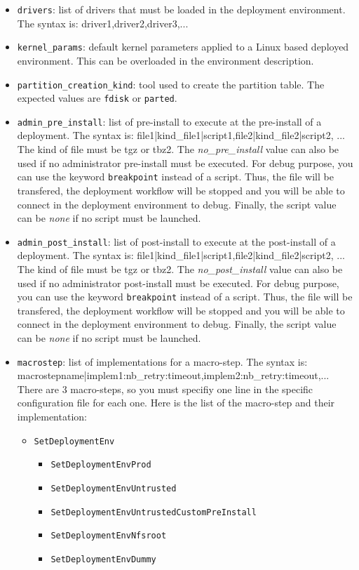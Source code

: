 \documentclass[a4wide,10pt,oneside]{book}
\begin{document}
\begin{itemize}
\item \texttt{drivers}: list of drivers that must be loaded in the deployment environment. The syntax is: driver1,driver2,driver3,...
\item \texttt{kernel\_params}: default kernel parameters applied to a Linux based deployed environment. This can be overloaded in the environment description.
\item \texttt{partition\_creation\_kind}: tool used to create the partition table. The expected values are \texttt{fdisk} or \texttt{parted}.
\item \texttt{admin\_pre\_install}: list of pre-install to execute at the pre-install of a deployment. The syntax is: file1|kind\_file1|script1,file2|kind\_file2|script2, ... The kind of file must be tgz or tbz2. The \textit{no\_pre\_install} value can also be used if no administrator pre-install must be executed. For debug purpose, you can use the keyword \texttt{breakpoint} instead of a script. Thus, the file will be transfered, the deployment workflow will be stopped and you will be able to connect in the deployment environment to debug. Finally, the script value can be \textit{none} if no script must be launched.
\item \texttt{admin\_post\_install}: list of post-install to execute at the post-install of a deployment. The syntax is: file1|kind\_file1|script1,file2|kind\_file2|script2, ... The kind of file must be tgz or tbz2. The \textit{no\_post\_install} value can also be used if no administrator post-install must be executed. For debug purpose, you can use the keyword \texttt{breakpoint} instead of a script. Thus, the file will be transfered, the deployment workflow will be stopped and you will be able to connect in the deployment environment to debug. Finally, the script value can be \textit{none} if no script must be launched.
\item \texttt{macrostep}: list of implementations for a macro-step. The syntax is: macrostepname|implem1:nb\_retry:timeout,implem2:nb\_retry:timeout,... There are 3 macro-steps, so you must specifiy one line in the specific configuration file for each one. Here is the list of the macro-step and their implementation:
  \begin{itemize}
  \item \texttt{SetDeploymentEnv}
    \begin{itemize}
    \item \texttt{SetDeploymentEnvProd}
    \item \texttt{SetDeploymentEnvUntrusted}
    \item \texttt{SetDeploymentEnvUntrustedCustomPreInstall}
    \item \texttt{SetDeploymentEnvNfsroot}
    \item \texttt{SetDeploymentEnvDummy}
    \end{itemize}


\end{itemize}
\end{itemize}
\end{document}
